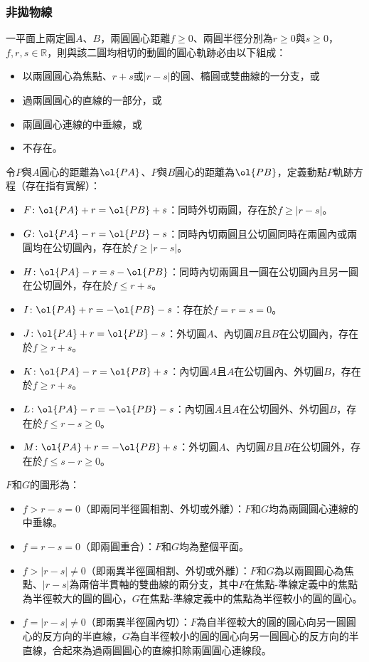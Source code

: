 \documentclass[a4paper,12pt]{article}
\begin{document}
\subsubsection{非拋物線}
一平面上兩定圓$A$、$B$，兩圓圓心距離$f\geq 0$、兩圓半徑分別為$r\geq 0$與$s\geq 0$，$f,r,s\in\mathbb{R}$，則與該二圓均相切的動圓的圓心軌跡必由以下組成：
\begin{itemize}
\item 以兩圓圓心為焦點、$r+s$或$|r-s|$的圓、橢圓或雙曲線的一分支，或
\item 過兩圓圓心的直線的一部分，或
\item 兩圓圓心連線的中垂線，或
\item 不存在。
\end{itemize}
令$P$與$A$圓心的距離為$\ol{PA}$、$P$與$B$圓心的距離為$\ol{PB}$，定義動點$P$軌跡方程（存在指有實解）：
\begin{itemize}
\item $F\colon\ol{PA}+r=\ol{PB}+s$：同時外切兩圓，存在於$f\geq|r-s|$。
\item $G\colon\ol{PA}-r=\ol{PB}-s$：同時內切兩圓且公切圓同時在兩圓內或兩圓均在公切圓內，存在於$f\geq|r-s|$。
\item $H\colon\ol{PA}-r=s-\ol{PB}$：同時內切兩圓且一圓在公切圓內且另一圓在公切圓外，存在於$f\leq r+s$。
\item $I\colon\ol{PA}+r=-\ol{PB}-s$：存在於$f=r=s=0$。
\item $J\colon\ol{PA}+r=\ol{PB}-s$：外切圓$A$、內切圓$B$且$B$在公切圓內，存在於$f\geq r+s$。
\item $K\colon\ol{PA}-r=\ol{PB}+s$：內切圓$A$且$A$在公切圓內、外切圓$B$，存在於$f\geq r+s$。
\item $L\colon\ol{PA}-r=-\ol{PB}-s$：內切圓$A$且$A$在公切圓外、外切圓$B$，存在於$f\leq r-s\geq 0$。
\item $M\colon\ol{PA}+r=-\ol{PB}+s$：外切圓$A$、內切圓$B$且$B$在公切圓外，存在於$f\leq s-r\geq 0$。
\end{itemize}
$F$和$G$的圖形為：
\begin{itemize}
\item $f>r-s=0$（即兩同半徑圓相割、外切或外離）：$F$和$G$均為兩圓圓心連線的中垂線。
\item $f=r-s=0$（即兩圓重合）：$F$和$G$均為整個平面。
\item $f>|r-s|\neq 0$（即兩異半徑圓相割、外切或外離）：$F$和$G$為以兩圓圓心為焦點、$|r-s|$為兩倍半貫軸的雙曲線的兩分支，其中$F$在焦點-準線定義中的焦點為半徑較大的圓的圓心，$G$在焦點-準線定義中的焦點為半徑較小的圓的圓心。
\item $f=|r-s|\neq 0$（即兩異半徑圓內切）：$F$為自半徑較大的圓的圓心向另一圓圓心的反方向的半直線，$G$為自半徑較小的圓的圓心向另一圓圓心的反方向的半直線，合起來為過兩圓圓心的直線扣除兩圓圓心連線段。
\end{itemize}
\end{document}
